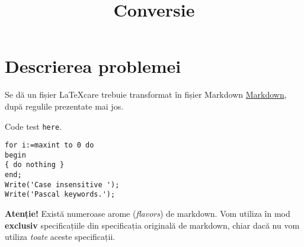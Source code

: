 \documentclass[a4paper, 12pt, twoside]{article}
\title{Conversie}\date{}
\begin{document}
\maketitle


\section{Descrierea problemei}\label{sec:problem}

Se dă un fișier \LaTeX care trebuie transformat în fișier Markdown \href{https://en.wikipedia.org/wiki/Markdown}{Markdown}, după regulile prezentate mai jos.

Code test \texttt{here}.

\begin{verbatim}
for i:=maxint to 0 do
begin
{ do nothing }
end;
Write('Case insensitive ');
Write('Pascal keywords.');
\end{verbatim}


\textbf{Atenție!} Există numeroase arome (\emph{flavors}) de markdown. Vom utiliza în mod \textbf{exclusiv} specificațiile din specificația originală de markdown, chiar dacă nu vom utiliza \emph{toate} aceste specificații.
\end{document}
